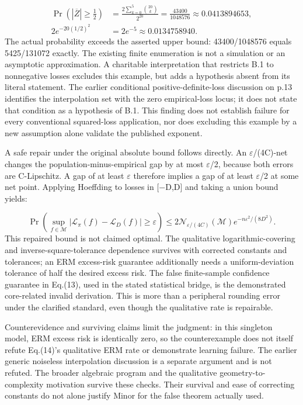 \documentclass[10pt]{article}
\begin{document}
\[\begin{aligned}\Pr(|\overline Z|\ge\tfrac12)&=\frac{2\sum_{k=0}^{5}\binom{20}{k}}{2^{20}}=\frac{43400}{1048576}\approx0.0413894653,\\2e^{-20(1/2)^2}&=2e^{-5}\approx0.0134758940.\end{aligned}\] The actual probability exceeds the asserted upper bound: 43400/1048576 equals 5425/131072 exactly. The existing finite enumeration is not a simulation or an asymptotic approximation. A charitable interpretation that restricts B.1 to nonnegative losses excludes this example, but adds a hypothesis absent from its literal statement. The earlier conditional positive-definite-loss discussion on p.13 identifies the interpolation set with the zero empirical-loss locus; it does not state that condition as a hypothesis of B.1. This finding does not establish failure for every conventional squared-loss application, nor does excluding this example by a new assumption alone validate the published exponent.\par
A safe repair under the original absolute bound follows directly. An \(\varepsilon\)/(4C)-net changes the population-minus-empirical gap by at most \(\varepsilon\)/2, because both errors are C-Lipschitz. A gap of at least \(\varepsilon\) therefore implies a gap of at least \(\varepsilon\)/2 at some net point. Applying Hoeffding to losses in [\(-\)D,D] and taking a union bound yields:\par
\[\Pr\!\left(\sup_{f\in\mathcal M}|\mathcal L_\pi(f)-\mathcal L_D(f)|\ge\varepsilon\right)\le2\mathcal N_{\varepsilon/(4C)}(\mathcal M)e^{-n\varepsilon^2/(8D^2)}.\] This repaired bound is not claimed optimal. The qualitative logarithmic-covering and inverse-square-tolerance dependence survives with corrected constants and tolerances; an ERM excess-risk guarantee additionally needs a uniform-deviation tolerance of half the desired excess risk. The false finite-sample confidence guarantee in Eq.(13), used in the stated statistical bridge, is the demonstrated core-related invalid derivation. This is more than a peripheral rounding error under the clarified standard, even though the qualitative rate is repairable.\par
Counterevidence and surviving claims limit the judgment: in this singleton model, ERM excess risk is identically zero, so the counterexample does not itself refute Eq.(14)’s qualitative ERM rate or demonstrate learning failure. The earlier generic noiseless interpolation discussion is a separate argument and is not refuted. The broader algebraic program and the qualitative geometry-to-complexity motivation survive these checks. Their survival and ease of correcting constants do not alone justify Minor for the false theorem actually used.\par
\end{document}
